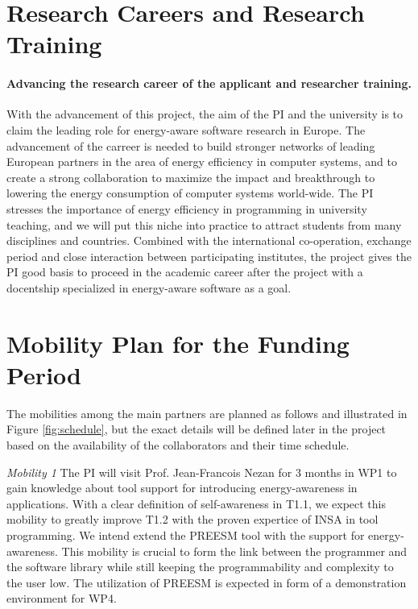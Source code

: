\documentclass{article}
\begin{document}
\section{Research Careers and Research Training}
\label{sec:cooperation}
\paragraph{Advancing the research career of the applicant and researcher training.}
With the advancement of this project, the aim of the PI and the university is to claim the leading role for energy-aware software research in Europe.
The advancement of the carreer is needed to build stronger networks of leading European partners in the area of energy efficiency in computer systems,
and to create a strong collaboration to maximize the impact and breakthrough to lowering the energy consumption of computer systems world-wide.
The PI stresses the importance of energy efficiency in programming in university teaching, and we will put this niche into practice to attract students from many disciplines and countries.
Combined with the international co-operation, exchange period and close interaction between participating institutes, the project gives the PI good basis to proceed in the academic career after the project with a docentship specialized in energy-aware software as a goal.

\section{Mobility Plan for the Funding Period}
The mobilities among the main partners are planned as follows and illustrated in Figure \ref{fig:schedule}, but the exact details will be defined later in the project based on the availability of the collaborators and their time schedule.

\textit{Mobility 1} The PI will visit Prof. Jean-Francois Nezan for 3 months in WP1 to gain knowledge about tool support for introducing energy-awareness in applications.
With a clear definition of self-awareness in T1.1, we expect this mobility to greatly improve T1.2 with the proven expertice of INSA in tool programming.
We intend extend the PREESM tool with the support for energy-awareness.
This mobility is crucial to form the link between the programmer and the software library while still keeping the programmability and complexity to the user low. 
The utilization of PREESM is expected in form of a demonstration environment for WP4.\smallskip
\end{document}
